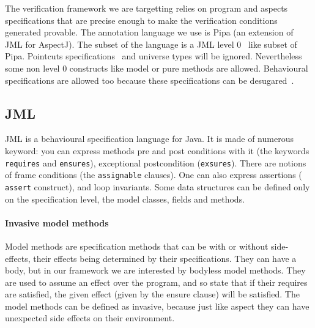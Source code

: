 The verification framework we are targetting relies on program and
aspects specifications that are precise enough to make the
verification conditions generated provable.  The annotation language
we use is Pipa (an extension of JML for AspectJ).  The subset of the
language is a JML level 0~\cite{Leavens-etal07} like subset of Pipa. 
Pointcuts specifications~\cite{pointcuts07}  and universe types 
will be ignored. Nevertheless some non level 0 constructs like model or pure
methods are allowed.
Behavioural specifications are allowed too because these specifications can
be desugared~\cite{RaghavanL00}.

\subsection{JML} 
JML is a behavioural specification language for Java. It is made of
numerous keyword: you can express methods pre and post conditions with
it (the keywords {\tt requires} and {\tt ensures}), exceptional
postcondition ({\tt exsures}). There are notions of frame conditions
(the {\tt assignable} clauses). One can also express assertions ({\tt
assert} construct), and loop invariants. Some data structures can be defined
only on the specification level, the model classes, fields and methods.

\paragraph{Invasive model methods} 
Model methods are specification methods that can be with or without
side-effects, their effects being determined by their specifications.
They can have a body, but in our framework we are interested by
bodyless model methods. They are used to assume an effect over the
program, and so state that if their requires are satisfied, the given
effect (given by the ensure clause) will be satisfied. The model methods can
be defined as invasive, because just like aspect they can have unexpected 
side effects on their environment.

